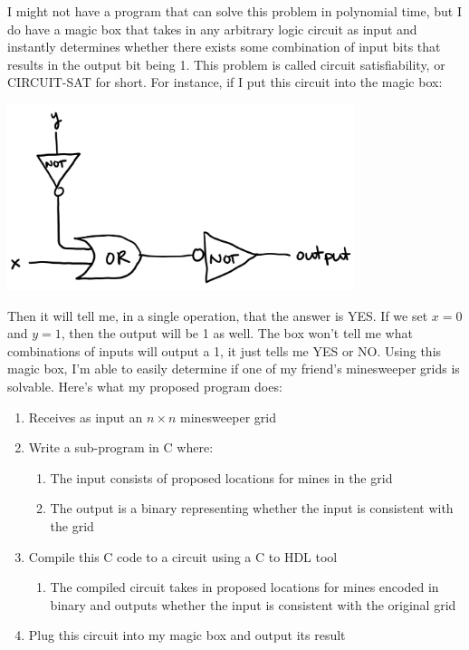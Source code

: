 \documentclass{article}
\begin{document}
I might not have a program that can solve this problem in polynomial time, but I do have a magic box that takes in any arbitrary logic circuit as input and instantly determines whether there exists some combination of input bits that results in the output bit being 1. This problem is called circuit satisfiability, or CIRCUIT-SAT for short. For instance, if I put this circuit into the magic box:

\begin{center}
    \includegraphics[width=4in]{images/Minesweeper_fig2.png}
\end{center}

Then it will tell me, in a single operation, that the answer is YES. If we set $x=0$ and $y=1$, then the output will be 1 as well. The box won’t tell me what combinations of inputs will output a 1, it just tells me YES or NO. Using this magic box, I’m able to easily determine if one of my friend’s minesweeper grids is solvable. Here’s what my proposed program does:
\begin{enumerate}
\item Receives as input an $n \times n$ minesweeper grid
\item Write a sub-program in C where:
    \begin{enumerate}
    \item The input consists of proposed locations for mines in the grid
    \item The output is a binary representing whether the input is consistent with the grid
    \end{enumerate}
\item Compile this C code to a circuit using a C to HDL tool
\begin{enumerate}
    \item The compiled circuit takes in proposed locations for mines encoded in binary and outputs whether the input is consistent with the original grid
\end{enumerate}
\item Plug this circuit into my magic box and output its result
\end{enumerate}
\end{document}
